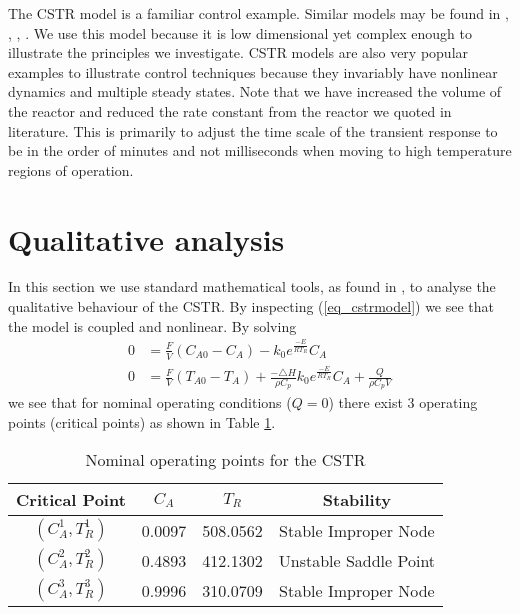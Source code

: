 The CSTR model is a familiar control example. Similar models may be found in \cite{du}, \cite{cervantes}, \cite{pan}, \cite{yazdi}. We use this model because it is low dimensional yet complex enough to illustrate the principles we investigate. CSTR models are also very popular examples to illustrate control techniques because they invariably have nonlinear dynamics and multiple steady states. Note that we have increased the volume of the reactor and reduced the rate constant from the reactor we quoted in literature. This is primarily to adjust the time scale of the transient response to be in the order of minutes and not milliseconds when moving to high temperature regions of operation.

\section{Qualitative analysis}
In this section we use standard mathematical tools, as found in \cite{edwardsandpenny}, to analyse the qualitative behaviour of the CSTR. By inspecting (\ref{eq_cstrmodel}) we see that the model is coupled and nonlinear. By solving
\begin{equation}
\begin{aligned}
0 &= \frac{F}{V}\left( C_{A0}-C_A \right) - k_0e^{\frac{-E}{RT_R}}C_A \\
0 &= \frac{F}{V}\left(T_{A0}-T_A\right) + \frac{-\triangle H}{\rho C_p}k_0e^{\frac{-E}{RT_R}}C_A + \frac{Q}{\rho C_p V}
\end{aligned}
\label{eq_cstr_statpoints}
\end{equation}
we see that for nominal operating conditions ($Q = 0$) there exist 3 operating points (critical points) as shown in Table \ref{tab_nominalstats}.
\begin{table}[H]
\begin{center}
\begin{tabular}{c c c c}
\hline
Critical Point & $C_A$ & $T_R$ & Stability\\
\hline
$\left(C_A^1, T_R^1\right)$ & 0.0097 & 508.0562 & Stable Improper Node\\
$\left(C_A^2, T_R^2\right)$ & 0.4893 & 412.1302 & Unstable Saddle Point \\
$\left(C_A^3, T_R^3 \right)$ & 0.9996 & 310.0709 & Stable Improper Node \\
\hline
\end{tabular}
\caption{Nominal operating points for  the CSTR}
\label{tab_nominalstats}
\end{center}
\end{table}
